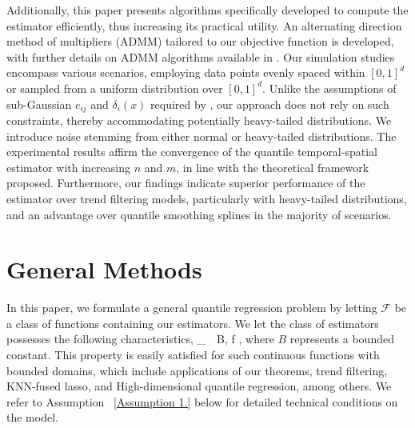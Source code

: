 \documentclass[twoside,11pt]{article}
\begin{document}




Additionally, this paper presents algorithms specifically developed to compute the estimator efficiently, thus increasing its practical utility. An alternating direction method of multipliers (ADMM) tailored to our objective function is developed, with further details on ADMM algorithms available in \cite{boyd2011distributed}. Our simulation studies encompass various scenarios, employing data points evenly spaced within $[0,1]^d$ or sampled from a uniform distribution over $[0,1]^d$. Unlike the assumptions of sub-Gaussian $e_{ij}$ and $\delta_i(x)$ required by \cite{padilla2023temporal}, our approach does not rely on such constraints, thereby accommodating potentially heavy-tailed distributions. We introduce noise stemming from either normal or heavy-tailed distributions. The experimental results affirm the convergence of the quantile temporal-spatial estimator with increasing $n$ and $m$, in line with the theoretical framework proposed. Furthermore, our findings indicate superior performance of the estimator over trend filtering models, particularly with heavy-tailed distributions, and an advantage over quantile smoothing splines in the majority of scenarios.














\section{General Methods}

In this paper, we formulate a general quantile regression problem by letting $\mathcal{F}$ be a class of functions containing our estimators.
We let the class of estimators possesses the following characteristics, 
\beq 
\label{F_2}
_{\infty} \,\leq\, B, \quad \forall f \in {},
\beq
where $B$ represents a bounded constant. This property is easily satisfied for such continuous functions with bounded domains, which include applications of our theorems, trend filtering, KNN-fused lasso, and High-dimensional quantile regression, among others. We refer to Assumption ~\ref{Assumption 1.} below for detailed technical conditions on the model.
\end{document}
